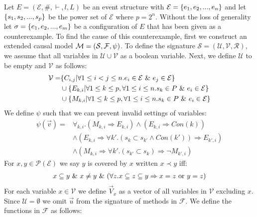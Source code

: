 Let $E = (\mathcal{E},\#,\vdash,l,L)$ be an event structure with
$\mathcal{E} = \{e_1, e_2, ...,e_n\}$ and let $\{s_1,s_2,...,s_p\}$ be the power set of $\mathcal{E}$ where $p = 2^n$.
Without the loss of generality let $\sigma = \{e_1,e_2,...,e_m\}$ be a configuration of $E$ that
has been given as a counterexample.
To find the cause of this counterexample, first we construct an extended causal model $\mathcal{M} = (\mathcal{S},\mathcal{F},\psi)$.
To define the signature $\mathcal{S} = (\mathcal{U},\mathcal{V},\mathcal{R})$, we assume that all variables in $\mathcal{U} \cup \mathcal{V}$ as a boolean variable.
Next, we define $\mathcal{U}$ to be empty and $\mathcal{V}$ as follows:
\begin{align*}
    \mathcal{V} = & \{C_{i,j} | \forall 1 \leq i < j \leq n. e_i \in \mathcal{E} \ \& \  e_j \in \mathcal{E}\}                    \\
                  & \cup \{E_{k,i} | \forall 1 \leq k \leq p , \forall 1 \leq i \leq n . s_k \in P \ \& \  e_i \in \mathcal{E} \} \\
                  & \cup \{M_{k,i} | \forall 1 \leq k \leq p , \forall 1 \leq i \leq n . s_k \in P \ \& \  e_i \in \mathcal{E} \} \\
\end{align*}
We define $\psi$ such that we can prevent invalid settings of variables:
\begin{align*}
    \psi(\vec v) = & \forall_{k,i}.
    \left(
    M_{k,i} \Rightarrow E_{k,i}
    \right)
    \wedge
    \left(
    E_{k,i} \Rightarrow Con(k)
    \right)
    \\
                   & \wedge \left(E_{k,i} \Rightarrow
    \forall k'. (s_k \subset s_{k'} \wedge Con(k')) \Rightarrow E_{k',i}
    \right)                                           \\
                   & \wedge \left(
    M_{k,i} \Rightarrow \forall k'.
    (s_{k'} \subset s_k) \Rightarrow \neg M_{k',i}
    \right)
\end{align*}
For $x,y \in \mathcal{P}(\mathcal{E})$ we say $y$ is covered by $x$ written $ x \prec y$ iff:
\begin{align*}
    x \subseteq y \ \& \  x \neq y \ \& \ 
    (\forall z. x \subseteq z \subseteq y \Rightarrow x = z
    \text{ or } y = z)
\end{align*}
For each variable $x \in \mathcal{V}$ we define $\vec V_x$ as a vector
of all variables in $\mathcal{V}$ excluding $x$.
Since $\mathcal{U} = \emptyset$ we omit $\vec u$ from the
signature of methods in $\mathcal{F}$.
We define the functions in $\mathcal{F}$ as follows:
